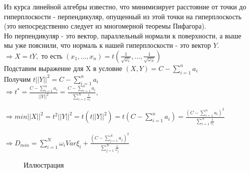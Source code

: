 \documentclass[12pt,a4paper]{article}
\begin{document}
Из курса линейной алгебры известно, что минимизирует расстояние от точки до гиперплоскости - перпендикуляр, опущенный из этой точки на гиперплоскость (это непосредственно следует из многомерной  теоремы Пифагора).\\
 Но перпендикуляр - это вектор, параллельный нормали к поверхности, а  выше мы уже пояснили, что нормаль к  нашей гиперплоскости - это вектор $Y$.\\

$\Rightarrow X=tY,$ то есть $(x_1, \dots, x_n) = t(\frac{1}{\sqrt {\omega_1} }, \ldots, \frac{1}{\sqrt {\omega_N}} )$\\

Подставим выражение для X в условие  $(X,Y) = C- \sum \limits_{i=1}^{n} a_i $\\

Получим $t||Y||^2 = C -  \sum \limits_{i=1}^{n} a_i $\\



$ \Rightarrow  t^* =   \frac{ C-\sum\limits_{i=1}^{n} a_i} { ||Y||^2} = \frac{ C-\sum\limits_{i=1}^{n} a_i} {\sum\limits_{i=1}^{N} \frac{1}{\omega_i}}$, 


$\Rightarrow min  ||X||^2 =  t^2 ||Y||^2 = t(t||Y||^2) = t(C - \sum \limits_{i=1}^{n} a_i ) =  \frac{ (C-\sum\limits_{i=1}^{n} a_i )^2} {\sum\limits_{i=1}^{N} \frac{1}{\omega_i}}$


$\Rightarrow D_{min}= \sum \limits_{i=1}^{N} \omega_i Var\xi_i  +  \frac{(C-\sum\limits_{j=1}^{N} a_j)^2}
{\sum\limits_{j=1}^{N} \frac{1}{\omega_j}} $


 \begin{figure}[h]
\caption{ Иллюстрация}
\label{fig:image}
\end{figure}
\end{document}
